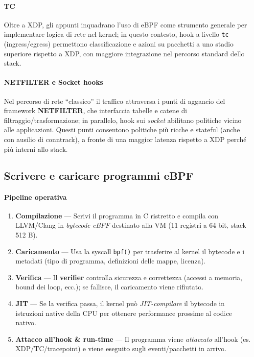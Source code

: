 \paragraph{TC}
Oltre a XDP, gli appunti inquadrano l’uso di eBPF come strumento generale per implementare logica di rete nel kernel; in questo contesto, hook a livello \texttt{tc} (ingress/egress) permettono classificazione e azioni su pacchetti a uno stadio superiore rispetto a XDP, con maggiore integrazione nel percorso standard dello stack.

\paragraph{NETFILTER e Socket hooks}
Nel percorso di rete “classico” il traffico attraversa i punti di aggancio del framework \textbf{NETFILTER}, che interfaccia tabelle e catene di filtraggio/trasformazione; in parallelo, hook sui \emph{socket} abilitano politiche vicino alle applicazioni. Questi punti consentono politiche più ricche e stateful (anche con ausilio di conntrack), a fronte di una maggior latenza rispetto a XDP perché più interni allo stack.


\subsection{Scrivere e caricare programmi eBPF}

\paragraph{Pipeline operativa }
\begin{enumerate}
  \item \textbf{Compilazione} — Scrivi il programma in C ristretto e compila con LLVM/Clang in \emph{bytecode eBPF} destinato alla VM (11 registri a 64 bit, stack 512 B).
  \item \textbf{Caricamento} — Usa la syscall \texttt{bpf()} per trasferire al kernel il bytecode e i metadati (tipo di programma, definizioni delle mappe, licenza).
  \item \textbf{Verifica} — Il \textbf{verifier} controlla sicurezza e correttezza (accessi a memoria, bound dei loop, ecc.); se fallisce, il caricamento viene rifiutato.
  \item \textbf{JIT} — Se la verifica passa, il kernel può \emph{JIT-compilare} il bytecode in istruzioni native della CPU per ottenere performance prossime al codice nativo.
  \item \textbf{Attacco all’hook \& run-time} — Il programma viene \emph{attaccato} all’hook (es. XDP/TC/tracepoint) e viene eseguito sugli eventi/pacchetti in arrivo.
\end{enumerate}

